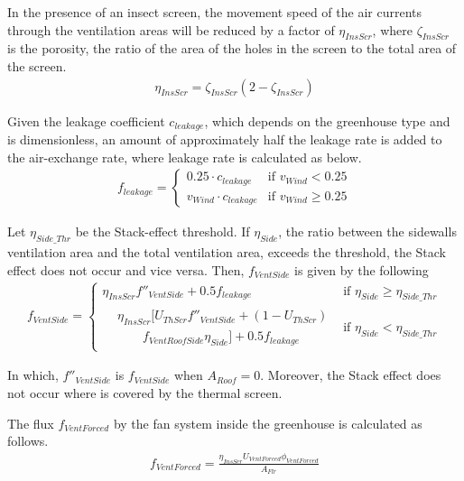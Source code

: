 \documentclass[a4paper]{article}
\numberwithin{equation}{section}
\begin{document}
In the presence of an insect screen, the movement speed of the air currents through the ventilation areas will be reduced by a factor of \(\eta_{InsScr}\), where \(\zeta_{InsScr}\) is the porosity, the ratio of the area of the holes in the screen to the total area of the screen.
\begin{align}
  \eta_{InsScr} = \zeta_{InsScr} (2 -  \zeta_{InsScr})
\end{align}

Given the leakage coefficient \(c_{leakage}\), which depends on the greenhouse type and is dimensionless, an amount of approximately half the leakage rate is added to the air-exchange rate, where leakage rate is calculated as below.
\begin{align}
  f_{leakage} = \begin{cases}
    0.25 \cdot c_{leakage}     & \text{if~} v_{Wind} < 0.25    \\
    v_{Wind} \cdot c_{leakage} & \text{if~} v_{Wind} \geq 0.25
  \end{cases}
\end{align}

Let \(\eta_{Side\_Thr}\) be the Stack-effect threshold. If \(\eta_{Side}\), the ratio between the sidewalls ventilation
area and the total ventilation area, exceeds the threshold, the Stack effect does not occur and vice versa. Then, \(f_{VentSide}\) is given by the following
\begin{gather}
  f_{VentSide} =
  \begin{cases}
    \eta_{InsScr} f''_{VentSide} + 0.5f_{leakage} & \text{if~} \eta_{Side} \geq \eta_{Side\_Thr} \\
    \begin{split}
      & \eta_{InsScr} [U_{ThScr}f''_{VentSide} + (1-U_{ThScr}) \\
      & \qquad f_{VentRoofSide} \eta_{Side}] + 0.5 f_{leakage}
    \end{split}                    & \text{if~} \eta_{Side} < \eta_{Side\_Thr}
  \end{cases}
\end{gather}

In which,  \(f''_{VentSide}\) is  \(f_{VentSide}\) when \(A_{Roof} = 0\).
Moreover, the Stack effect does not occur where is covered by the thermal screen.

The flux \(f_{VentForced}\) by the fan system inside the greenhouse is calculated as follows.
\begin{align}
  f_{VentForced} = \frac{\eta_{InsScr} U_{VentForced} \phi_{VentForced} } {A_{Flr}}
\end{align}
\end{document}
